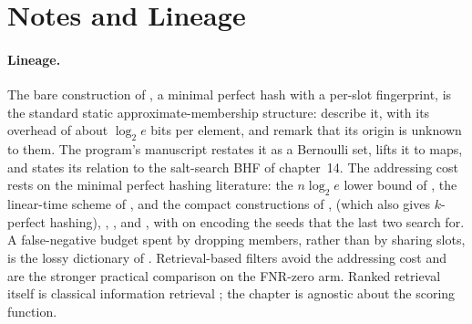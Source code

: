 %

\section{Notes and Lineage}
\label{sec:bib-notes-ch15}

\paragraph{Lineage.}
The bare construction of , a minimal perfect
hash with a per-slot fingerprint, is the standard static
approximate-membership structure: \textcite[Sec.~1]{dietzfelbinger-pagh-2008}
describe it, with its overhead of about $\log_2 e$ bits per element, and
remark that its origin is unknown to them. The program's manuscript
\parencite{towell-bernoulli-phf} restates it as a Bernoulli set, lifts it
to maps, and states its relation to the salt-search BHF of chapter~14. The
addressing cost rests on the minimal perfect hashing literature: the
$n \log_2 e$ lower bound of \textcite{fredman-komlos-1984}, the
linear-time scheme of \textcite{fredman-komlos-szemeredi-1984}, and the
compact constructions of \textcite{botelho-pagh-ziviani-2007},
\textcite{belazzougui-2009} (which also gives $k$-perfect hashing),
\textcite{limasset-et-al-2017}, \textcite{esposito-graf-vigna-2020}, and
\textcite{lehmann-sanders-walzer-2024}, with \textcite{lehmann-et-al-2025}
on encoding the seeds that the last two search for. A false-negative
budget spent by dropping members, rather than by sharing slots, is the
lossy dictionary of \textcite{pagh-rodler-2001}. Retrieval-based filters
\parencite{chazelle-et-al-2004,graf-lemire-2020,graf-lemire-2022,dietzfelbinger-et-al-2026-ribbon}
avoid the addressing cost and are the stronger practical comparison on
the FNR-zero arm. Ranked retrieval itself is classical information
retrieval \parencite{manning-raghavan-schutze}; the chapter is agnostic
about the scoring function.

